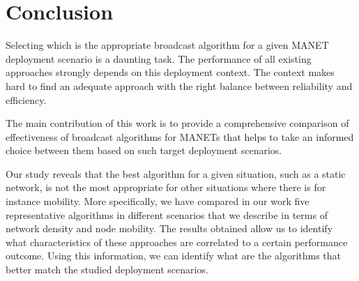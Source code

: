 
\section{Conclusion}
\label{sec:conclusion}

Selecting which is the appropriate broadcast algorithm for a given MANET deployment scenario is a daunting task.
%
The performance of all existing approaches strongly depends on this deployment context.
The context makes hard to find an adequate approach with the right balance between reliability and efficiency.

The main contribution of this work is to provide a comprehensive comparison of
effectiveness of broadcast algorithms for MANETs that helps to take an
informed choice between them based on such target deployment scenarios.

Our study reveals that the best algorithm for a given situation, such as a static network, is not the most appropriate for other situations where there is for instance mobility.
%
More specifically, we have compared in our work five representative algorithms  in different scenarios that we describe in terms of network density and node mobility.
%
The results obtained allow us to identify what characteristics of these approaches are correlated to a certain performance outcome.
%
Using this information, we can identify what are the algorithms that better match the studied deployment scenarios.   
